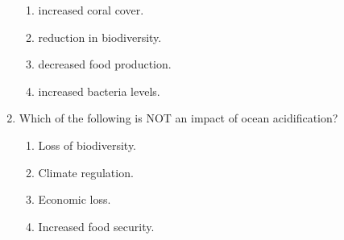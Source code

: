 \documentclass{report}
\begin{document}
\begin{enumerate}
    \begin{enumerate}
        \item   increased coral cover. 
        \item   reduction in biodiversity. 
        \item   decreased food production. 
        \item   increased bacteria levels. 
    \end{enumerate}
    \item Which of the following is NOT an impact of ocean acidification?
    \begin{enumerate}
        \item   Loss of biodiversity. 
        \item   Climate regulation. 
        \item   Economic loss. 
        \item   Increased food security. 
    \end{enumerate}
\end{enumerate}
\end{document}
